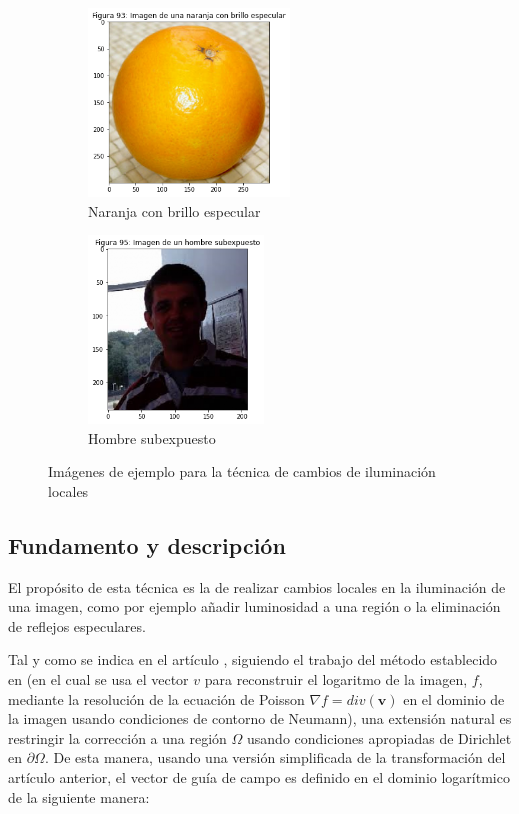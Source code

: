 \documentclass[11pt,twoside,titlepage,a4paper]{article}
\numberwithin{equation}{section} %
\theoremstyle{usual}
\begin{document}
\begin{figure}[h]
    \centering
    \begin{subfigure}[b]{.35\textwidth}
        \centering
        \includegraphics[width=\textwidth, height=5cm]{imagenes/PoissonImageEditing_cell_101_output_0.png}
        \caption{Naranja con brillo especular}
        \label{fig:naranjaBrillo}
    \end{subfigure}%
    \begin{subfigure}[b]{.3\textwidth}
        \centering
        \includegraphics[width=\textwidth, height=5cm]{imagenes/PoissonImageEditing_cell_101_output_2.png}
        \caption{Hombre subexpuesto}
        \label{fig:hombreOscuro}
    \end{subfigure}
    \caption{Imágenes de ejemplo para la técnica de cambios de iluminación locales}
    \label{fig:ejemplosCambiosIluminación}
\end{figure}

\subsection{Fundamento y descripción}

El propósito de esta técnica es la de realizar cambios locales en la iluminación de una imagen, como por ejemplo añadir luminosidad a una región o la eliminación de reflejos especulares.

Tal y como se indica en el artículo \cite{poissonImageEditing}, siguiendo el trabajo del método establecido en \cite{fattal_lischinski_werman_2002} (en el cual se usa el vector $v$ para reconstruir el logaritmo de la imagen, $f$, mediante la resolución de la ecuación de Poisson $\nabla f = div(\boldsymbol{v})$ en el dominio de la imagen usando condiciones de contorno de Neumann), una extensión natural es restringir la corrección a una región $\Omega$ usando condiciones apropiadas de Dirichlet en $\partial\Omega$. De esta manera, usando una versión simplificada de la transformación del artículo anterior, el vector de guía de campo es definido en el dominio logarítmico de la siguiente manera:
\end{document}
